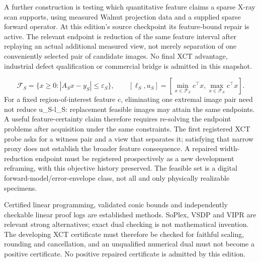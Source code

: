 \documentclass[11pt,letterpaper]{article}
\begin{document}
A further construction is testing which quantitative feature claims a sparse X-ray scan supports, using measured Walnut projection data and a supplied sparse forward operator. At this edition's source checkpoint its feature-bound repair is active. The relevant endpoint is reduction of the same feature interval after replaying an actual additional measured view, not merely separation of one conveniently selected pair of candidate images. No final XCT advantage, industrial defect qualification or commercial bridge is admitted in this snapshot.\par
\[\mathcal{F}_{S}=\{x\geq0: |A_{S}x-y_{S}|\leq\varepsilon_{S}\},\qquad [\ell_S,u_S]=\left[\min_{x\in\mathcal{F}_S}c^\top x,\max_{x\in\mathcal{F}_S}c^\top x\right].\]
For a fixed region-of-interest feature c, eliminating one extremal image pair need not reduce u\_S-l\_S: replacement feasible images may attain the same endpoints. A useful feature-certainty claim therefore requires re-solving the endpoint problems after acquisition under the same constraints. The first registered XCT probe asks for a witness pair and a view that separates it; satisfying that narrow proxy does not establish the broader feature consequence. A repaired width-reduction endpoint must be registered prospectively as a new development reframing, with this objective history preserved. The feasible set is a digital forward-model/error-envelope class, not all and only physically realizable specimens.\par
Certified linear programming, validated conic bounds and independently checkable linear proof logs are established methods. SoPlex, VSDP and VIPR are relevant strong alternatives; exact dual checking is not mathematical invention. The developing XCT certificate must therefore be checked for faithful scaling, rounding and cancellation, and an unqualified numerical dual must not become a positive certificate. No positive repaired certificate is admitted by this edition.\par
\end{document}
